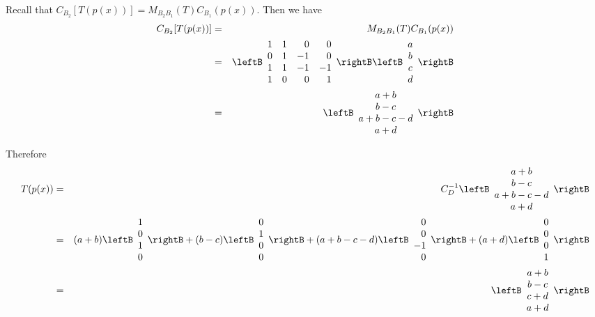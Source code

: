 \begin{solution}
Recall that $C_{B_2}[T(p(x))] = M_{B_2B_1}(T) C_{B_1}(p(x))$. 
Then we have 
\begin{eqnarray*}
C_{B_2}[T(p(x))] &=& M_{B_2B_1}(T) C_{B_1}(p(x)) \\
&=& 
\leftB \begin{array}{rrrr}
1 & 1 & 0 & 0 \\
0 & 1 & -1 & 0 \\
1 & 1 & -1 & -1 \\
1 & 0 & 0 & 1 
\end{array} \rightB \leftB \begin{array}{c}
a \\ 
b \\
c \\
d 
\end{array} \rightB \\
&=& 
\leftB \begin{array}{c}
a + b \\ 
b - c \\
a + b - c - d\\
a + d
\end{array} \rightB
\end{eqnarray*}

Therefore 
\begin{eqnarray*}
T(p(x)) &=& C^{-1}_D \leftB \begin{array}{c}
a + b \\ 
b - c \\
a + b - c - d\\
a + d
\end{array} \rightB \\
&=& (a+b) \leftB \begin{array}{r}
1 \\
0 \\
1 \\
0
\end{array} \rightB + (b-c) \leftB \begin{array}{r}
0 \\
1 \\
0 \\
0
\end{array} \rightB + 
(a+b-c-d) \leftB \begin{array}{r}
0 \\
0 \\
-1 \\
0
\end{array} \rightB + 
(a+d) \leftB \begin{array}{r}
0 \\
0 \\
0 \\
1
\end{array} \rightB \\
&=&
\leftB \begin{array}{c}
a + b \\
b - c \\
c + d \\
a +d 
\end{array} \rightB
\end{eqnarray*}


\end{solution}
